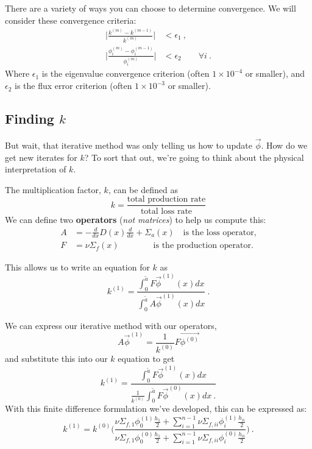 \documentclass[12pt]{article}
\newcommand{\ve}[1]{\ensuremath{\mathbf{#1}}}
\begin{document}
There are a variety of ways you can choose to determine convergence. We will consider these convergence criteria:
\begin{align}
\bigg|\frac{k^{(m)} - k^{(m-1)}}{k^{(m)}}\bigg| &< \epsilon_1 \:, \nonumber \\
\bigg|\frac{\phi_i^{(m)} - \phi_i^{(m-1)}}{\phi_i^{(m)}}\bigg| &< \epsilon_2 \qquad \forall i\:. \nonumber
\end{align}
%
Where $\epsilon_1$ is the eigenvalue convergence criterion (often $1 \times 10^{-4}$ or smaller), and $\epsilon_2$ is the flux error criterion (often $1 \times 10^{-3}$ or smaller).

\subsection*{Finding $k$}

But wait, that iterative method was only telling us how to update $\vec{\phi}$. How do we get new iterates for $k$? To sort that out, we're going to think about the physical interpretation of $k$.

The multiplication factor, $k$, can be defined as
\[k = \frac{\text{total production rate}}{\text{total loss rate}}\]
%
We can define two \textbf{operators} (\emph{not matrices}) to help us compute this:
%
\begin{align}
A &= -\frac{d}{dx}D(x)\frac{d}{dx} + \Sigma_a(x) \quad \text{is the loss operator,} \nonumber \\
F &= \nu\Sigma_f(x) \qquad \qquad \text{is the production operator.}\nonumber
\end{align}

This allows us to write an equation for $k$ as
\[k^{(1)} = \frac{\int_0^{\tilde{a}} F \vec{\phi}^{(1)}(x)dx}{\int_0^{\tilde{a}} A \vec{\phi}^{(1)}(x)dx}\:. \]

We can express our iterative method with our operators,
\[ A \vec{\phi}^{(1)} = \frac{1}{k^{(0)}}F\vec{\phi^{(0)}}\]
%
and substitute this into our $k$ equation to get
\[k^{(1)} = \frac{\int_0^{\tilde{a}} F \vec{\phi}^{(1)}(x)dx}{\frac{1}{k^{(0)}}\int_0^{\tilde{a}} F \vec{\phi}^{(0)}(x)dx\:.} \]
%
With this finite difference formulation we've developed, this can be expressed as:
\[k^{(1)} = k^{(0)}\Biggl(\frac{\nu\Sigma_{f,1} \phi_0^{(1)} \frac{h_1}{2} + \sum_{i=1}^{n-1} \nu\Sigma_{f,ii} \phi_i^{(1)} \frac{h_{ii}}{2}}
{\nu\Sigma_{f,1} \phi_0^{(0)} \frac{h_1}{2} + \sum_{i=1}^{n-1} \nu\Sigma_{f,ii} \phi_i^{(0)} \frac{h_{ii}}{2}}\Biggr)\:.\]
\end{document}

